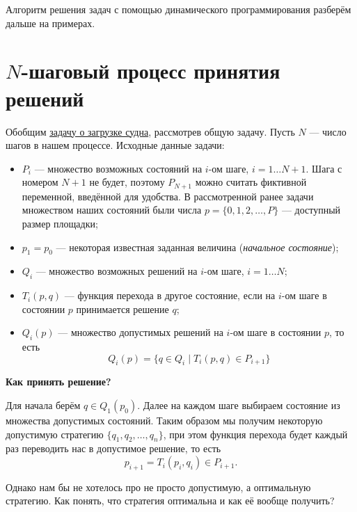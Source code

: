 Алгоритм решения задач с помощью динамического программирования разберём дальше на примерах.

\section{$N$-шаговый процесс принятия решений}\label{n_step_process}

Обобщим \hyperref[pr:loading_vessel]{задачу о загрузке судна}, рассмотрев общую задачу. Пусть $N$ --- число шагов в нашем процессе. Исходные данные задачи:

\begin{itemize}[nosep]
	\item $P_i$ --- множество возможных состояний на $i$-ом шаге, $i = 1 \dots N+1$. Шага с номером $N+1$ не будет, поэтому $P_{N+1}$ можно считать фиктивной переменной, введённой для удобства. В рассмотренной ранее задачи множеством наших состояний были числа $p=\{0, 1, 2, \dots, P\}$ --- доступный размер площадки;
	
	\item $p_1 = p_0$ --- некоторая известная заданная величина (\textit{начальное состояние});
	
	\item $Q_i$ --- множество возможных решений на $i$-ом шаге, $i = 1 \dots N$;
	
	\item $T_i(p, q)$ --- функция перехода в другое состояние, если на $i$-ом шаге в состоянии $p$ принимается решение $q$;
	
	\item $Q_i(p)$ --- множество допустимых решений на $i$-ом шаге в состоянии $p$, то есть
	\[
	Q_i(p) = \{q \in Q_i \; \big| \; T_i(p, q) \in P_{i+1}\}
	\]	
\end{itemize}

\bigskip

\textbf{Как принять решение?}

Для начала берём $q \in Q_1(p_0)$. Далее на каждом шаге выбираем состояние из множества допустимых состояний. Таким образом мы получим некоторую допустимую стратегию $\{q_1, q_2, \dots, q_n\}$, при этом функция перехода будет каждый раз переводить нас в допустимое решение, то есть
\[
p_{i+1} = T_i(p_i, q_i) \in P_{i+1}.
\]

Однако нам бы не хотелось про не просто допустимую, а оптимальную стратегию. Как понять, что стратегия оптимальна и как её вообще получить?

\remark

